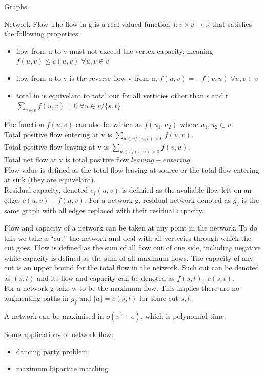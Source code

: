 \documentclass[12pt, letterpaper]{article}
\begin{document}
\begin{section}{Graphs}
\begin{subsection}{Network Flow}
    The flow in g is a real-valued function \(f: v \times v \to \mathbb{R}\)
    that satisfies the following properties:
    \begin{itemize}
      \item flow from u to v must not exceed the vertex capacity, meaning
            \(f(u, v) \leq c(u, v) \; \forall u, v \in v\)
      \item flow from u to v is the reverse flow v from u,
            \(f(u, v) = -f(v, u) \; \forall u, v \in v\)
      \item total in is equivelant to total out for all verticies other than s and t
            \(\sum_{v \in v} f(u, v) = 0 \; \forall u \in v/\{{} s, t \}{}\)
    \end{itemize}
    Fhe function \(f(u, v)\) can also be wirten as \(f(u_{1}, u_{2})\) where
    \(u_{1}, u_{2} \subset v\). \\
    Total positive flow entering at v is \(\sum_{u \in v f(u, v) > 0} f(u, v)\). \\
    Total positive flow leaving at v is \(\sum_{u \in v f(v, u) > 0} f(v, u)\). \\
    Total net flow at v is total positive flow \(leaving - entering\). \\
    Flow value is defined as the total flow leaving at source or the total
    flow entering at sink (they are equivelant). \\
    Residual capacity, denoted \(c_{f}(u, v)\) is definied as the avaliable flow
    left on an edge, \(c(u, v) - f(u, v)\). For a network g, residual network denoted as \(g_{f}\)
    is the same graph with all edges replaced with their residual capacity.

    Flow and capacity of a network can be taken at any point in the network.
    To do this we take a ``cut'' the network and deal with all vertecies through
    which the cut goes. Flow is defined as the sum of all flow out of one side, including
    negative while capacity is defined as the sum of all maximum flows. The capacity of any
    cut is an upper bound for the total flow in the network. Such cut can be denoted
    as \((s, t)\) and its flow and capacity can be denoted as \(f(s, t), \; c(s, t)\). \\
    For a network g take w to be the maximum flow. This implies there are no
    augmenting paths in \(g_{f}\) and \(|w| = c(s, t)\) for some cut \(s, t\).

    A network can be maximised in \(o(v^{2} + e)\), which is polynomial time.

    Some applications of network flow:
    \begin{itemize}
      \item dancing party problem
      \item maximum bipartite matching
    \end{itemize}

  \end{subsection}

\end{section}
\end{document}
